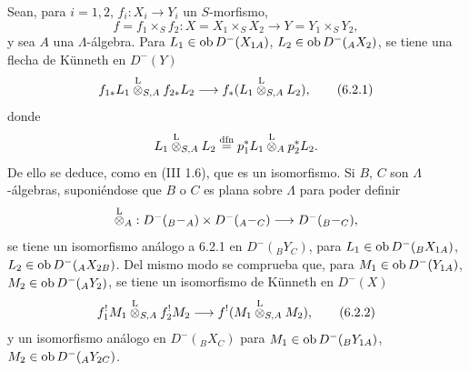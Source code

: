 Sean, para $i=1,2$, $f_i:X_i\to Y_i$ un $S$-morfismo,
\[
f=f_1\times_S f_2:X=X_1\times_SX_2\longrightarrow Y=Y_1\times_SY_2,
\]
y sea $A$ una $\Lambda$-álgebra. Para $L_1\in\operatorname{ob} D^-(X_{1A})$, $L_2\in\operatorname{ob} D^-({}_AX_2)$, se tiene una flecha de Künneth en $D^-(Y)$
\begin{equation}
f_{1*}L_1\overset{\mathrm L}{\otimes}_{S,A}f_{2*}L_2
\longrightarrow
f_*(L_1\overset{\mathrm L}{\otimes}_{S,A}L_2),
\tag{6.2.1}
\end{equation}
donde
\[
L_1\overset{\mathrm L}{\otimes}_{S,A}L_2
\stackrel{\mathrm{dfn}}{=}p_1^*L_1\overset{\mathrm L}{\otimes}_Ap_2^*L_2.
\]
De ello se deduce, como en (III 1.6), que es un isomorfismo. Si $B$, $C$ son $\Lambda$-álgebras, suponiéndose que $B$ o $C$ es plana sobre $\Lambda$ para poder definir
\[
\overset{\mathrm L}{\otimes}_A:D^-({}_B{-}_A)\times D^-({}_A{-}_C)\longrightarrow D^-({}_B{-}_C),
\]
se tiene un isomorfismo análogo a 6.2.1 en $D^-({}_BY_C)$, para $L_1\in\operatorname{ob} D^-({}_BX_{1A})$, $L_2\in\operatorname{ob} D^-({}_AX_{2B})$. Del mismo modo se comprueba que, para $M_1\in\operatorname{ob} D^-(Y_{1A})$, $M_2\in\operatorname{ob} D^-({}_AY_2)$, se tiene un isomorfismo de Künneth en $D^-(X)$
\begin{equation}
f_1^!M_1\overset{\mathrm L}{\otimes}_{S,A}f_2^!M_2
\longrightarrow
f^!(M_1\overset{\mathrm L}{\otimes}_{S,A}M_2),
\tag{6.2.2}
\end{equation}
y un isomorfismo análogo en $D^-({}_B X_C)$ para $M_1\in\operatorname{ob} D^-({}_BY_{1A})$, $M_2\in\operatorname{ob} D^-({}_AY_{2C})$.
